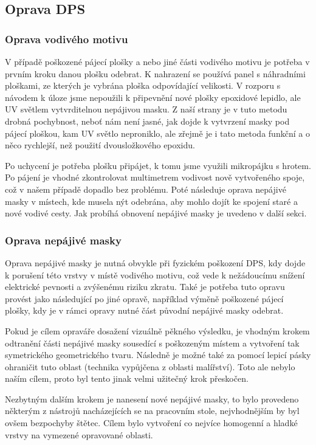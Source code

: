 \subsection{Oprava DPS}
    \subsubsection{Oprava vodivého motivu}
        V případě poškozené pájecí plošky a nebo jiné části vodivého motivu je potřeba v prvním kroku danou plošku odebrat. K nahrazení se používá panel s náhradními ploškami, ze kterých je vybrána ploška odpovídající velikosti. V rozporu s návodem k úloze \cite{zadani} jsme nepoužili k připevnění nové plošky epoxidové lepidlo, ale UV světlem vytvrditelnou nepájivou masku. Z naší strany je v tuto metodu drobná pochybnost, neboť nám není jasné, jak dojde k vytvrzení masky pod pájecí ploškou, kam UV světlo neproniklo, ale zřejmě je i tato metoda funkční a o něco rychlejší, než použití dvousložkového epoxidu.

        Po uchycení je potřeba plošku připájet, k tomu jsme využili mikropájku s hrotem. Po pájení je vhodné zkontrolovat multimetrem vodivost nově vytvořeného spoje, což v našem případě dopadlo bez problému. Poté následuje oprava nepájivé masky v místech, kde musela nýt odebrána, aby mohlo dojít ke spojení staré a nové vodivé cesty. Jak probíhá obnovení nepájivé masky je uvedeno v další sekci. 

    \subsubsection{Oprava nepájivé masky}
        Oprava nepájivé masky je nutná obvykle při fyzickém poškození DPS, kdy dojde k porušení této vrstvy v místě vodivého motivu, což vede k nežádoucímu snížení elektrické pevnosti a zvýšenému riziku zkratu. Také je potřeba tuto opravu provést jako následující po jiné opravě, například výměně poškozené pájecí plošky, kdy je v rámci opravy nutné část původní nepájivé masky odebrat.  

        Pokud je cílem opraváře dosažení vizuálně pěkného výsledku, je vhodným krokem odtranění části nepájivé masky sousedící s poškozeným místem a vytvoření tak symetrického geometrického tvaru. Následně je možné také za pomocí lepicí pásky ohraničit tuto oblast (technika vypůjčena z oblasti malířství). Toto ale nebylo naším cílem, proto byl tento jinak velmi užitečný krok přeskočen.

        Nezbytným dalším krokem je nanesení nové nepájivé masky, to bylo provedeno některým z nástrojů nacházejících se na pracovním stole, nejvhodnějším by byl ovšem bezpochyby štětec. Cílem bylo vytvoření co nejvíce homogenní a hladké vrstvy na vymezené opravované oblasti. 
        
